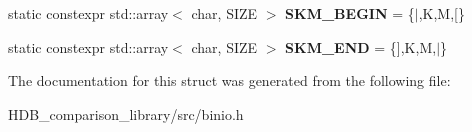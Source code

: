 \begin{DoxyCompactItemize}
\item 
\mbox{\label{structhelib_1_1EyeCatcher_a8aa797bd3a45d8f73d13987637fdb378}} 
static constexpr std\+::array$<$ char, S\+I\+ZE $>$ {\bfseries S\+K\+M\+\_\+\+B\+E\+G\+IN} = \{\textquotesingle{}$\vert$\textquotesingle{},\textquotesingle{}K\textquotesingle{},\textquotesingle{}M\textquotesingle{},\textquotesingle{}\mbox{[}\textquotesingle{}\}
\item 
\mbox{\label{structhelib_1_1EyeCatcher_a963392f91540d14221e834294063be36}} 
static constexpr std\+::array$<$ char, S\+I\+ZE $>$ {\bfseries S\+K\+M\+\_\+\+E\+ND} = \{\textquotesingle{}\mbox{]}\textquotesingle{},\textquotesingle{}K\textquotesingle{},\textquotesingle{}M\textquotesingle{},\textquotesingle{}$\vert$\textquotesingle{}\}
\end{DoxyCompactItemize}


The documentation for this struct was generated from the following file\+:\begin{DoxyCompactItemize}
\item 
H\+D\+B\+\_\+comparison\+\_\+library/src/binio.\+h\end{DoxyCompactItemize}
